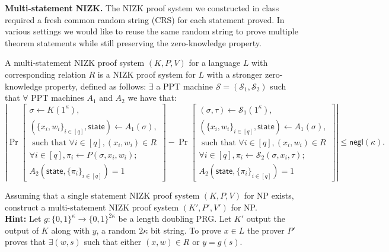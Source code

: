\begin{exercise}
\textbf{Multi-statement NIZK.} The NIZK proof system we constructed in class required a fresh common random string (CRS) for each statement proved. In various settings we would like to reuse the same random string to prove multiple theorem statements while still preserving the zero-knowledge property.
    
    A multi-statement NIZK proof system $(K,P,V)$ for a language $L$ with corresponding relation $R$ is a NIZK proof system for $L$ with a stronger zero-knowledge property, defined as follows: $\exists$ a PPT machine $\mathcal{S} = (\mathcal{S}_1,\mathcal{S}_2)$ such that $\forall$ PPT machines $A_1$ and $A_2$ we have that:
    \[\left|\Pr\left[\begin{split}\sigma \gets K(1^\kappa),\\ (\{x_i,w_i\}_{i \in [q]},\textsf{state}) \gets A_1(\sigma),\\ \text{ such that } \forall i \in [q], (x_i,w_i)\in R\\\forall i \in [q],  \pi_i \gets P(\sigma, x_i,w_i);\\
    A_2(\textsf{state}, \{\pi_i\}_{i \in [q]}) =1\end{split}\right]
    -
    \Pr\left[\begin{split}(\sigma,\tau) \gets \mathcal{S}_1(1^\kappa),\\ (\{x_i,w_i\}_{i \in [q]},\textsf{state}) \gets A_1(\sigma),\\\text{ such that } \forall i \in [q], (x_i,w_i)\in R\\\forall i \in [q],  \pi_i \gets \mathcal{S}_2(\sigma, x_i,\tau);\\ A_2(\textsf{state}, \{\pi_i\}_{i \in [q]})=1\end{split}\right]\right|
    \leq \textsf{negl}(\kappa).
    \]
    
    Assuming that a single statement NIZK proof system $(K,P,V)$ for NP exists, construct a multi-statement NIZK proof system $(K',P',V')$ for NP.\\
\textbf{Hint:} Let $g: \{0,1\}^\kappa \rightarrow \{0,1\}^{2\kappa}$ be a length doubling PRG. Let $K'$ output the output of $K$ along with $y$, a random $2\kappa$ bit string. To prove $x \in L$ the prover $P'$ proves that $\exists (w,s)$ such that either $(x,w)\in R$ or $y = g(s)$.
\end{exercise}





